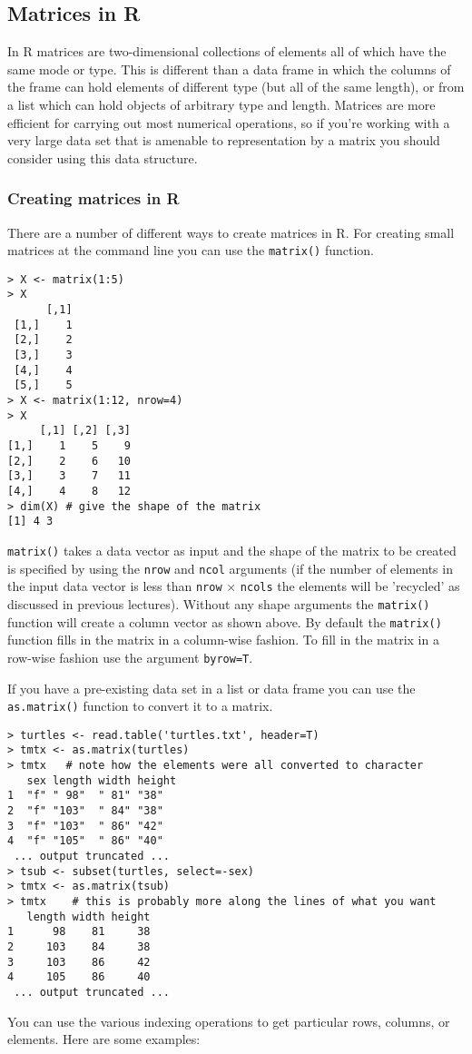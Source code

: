 



\subsection{Matrices in R}

In R matrices are two-dimensional collections of elements all of which
have the same mode or type. This is different than a data frame in which
the columns of the frame can hold elements of different type (but all of
the same length), or from a list which can hold objects of arbitrary
type and length. Matrices are more efficient for carrying out most
numerical operations, so if you're working with a very large data set
that is amenable to representation by a matrix you should consider using
this data structure.

\subsubsection{Creating matrices in R}

There are a number of different ways to create matrices in R. For
creating small matrices at the command line you can use the
\lstinline!matrix()! function.

\begin{lstlisting}
> X <- matrix(1:5)
> X
      [,1]
 [1,]    1
 [2,]    2
 [3,]    3
 [4,]    4
 [5,]    5
> X <- matrix(1:12, nrow=4)
> X
     [,1] [,2] [,3]
[1,]    1    5    9
[2,]    2    6   10
[3,]    3    7   11
[4,]    4    8   12
> dim(X) # give the shape of the matrix 
[1] 4 3
\end{lstlisting}
\lstinline!matrix()! takes a data vector as input and the shape of the
matrix to be created is specified by using the \lstinline!nrow! and
\lstinline!ncol! arguments (if the number of elements in the input data
vector is less than \lstinline!nrow! $\times$ \lstinline!ncols! the
elements will be 'recycled' as discussed in previous lectures). Without
any shape arguments the \lstinline!matrix()! function will create a
column vector as shown above. By default the \lstinline!matrix()!
function fills in the matrix in a column-wise fashion. To fill in the
matrix in a row-wise fashion use the argument \lstinline!byrow=T!.

If you have a pre-existing data set in a list or data frame you can use
the \lstinline!as.matrix()! function to convert it to a matrix.

\begin{lstlisting}
> turtles <- read.table('turtles.txt', header=T)
> tmtx <- as.matrix(turtles) 
> tmtx   # note how the elements were all converted to character 
   sex length width height
1  "f" " 98"  " 81" "38"  
2  "f" "103"  " 84" "38"  
3  "f" "103"  " 86" "42"  
4  "f" "105"  " 86" "40"  
 ... output truncated ...
> tsub <- subset(turtles, select=-sex)
> tmtx <- as.matrix(tsub)
> tmtx    # this is probably more along the lines of what you want
   length width height
1      98    81     38
2     103    84     38
3     103    86     42
4     105    86     40
 ... output truncated ...
\end{lstlisting}
You can use the various indexing operations to get particular rows,
columns, or elements. Here are some examples:

